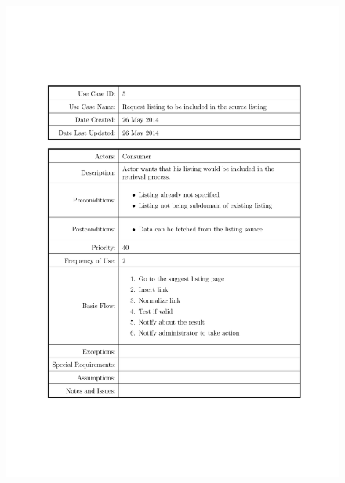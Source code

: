 \documentclass[a4paper]{tufte-book}
\begin{document}
\begin{figure}[h] \includegraphics[width=\linewidth]{Requirements/UseCases/005_RequestListingToBeIncluded.pdf}\end{figure}
\end{document}
